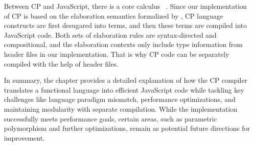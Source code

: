 Between CP and JavaScript, there is a core calculus
\fiplus~\citep{bi2019distributive,fan2022direct}. Since our implementation of CP
is based on the elaboration semantics formalized by
\citet{zhang2021compositional}, CP language constructs are first desugared into
\fiplus terms, and then these \fiplus terms are compiled into JavaScript code.
Both sets of elaboration rules are syntax-directed and compositional, and the
elaboration contexts only include type information from header files in our
implementation. That is why CP code can be separately compiled with the help of
header files.

In summary, the chapter provides a detailed explanation of how the CP compiler
translates a functional language into efficient JavaScript code while tackling
key challenges like language paradigm mismatch, performance optimizations, and
maintaining modularity with separate compilation. While the implementation
successfully meets performance goals, certain areas, such as parametric
polymorphism and further optimizations, remain as potential future directions
for improvement.
